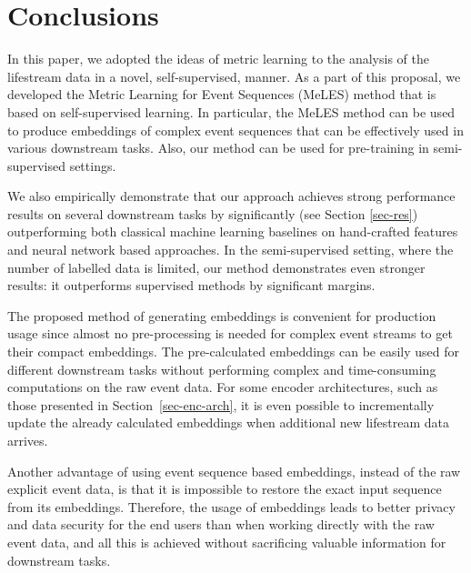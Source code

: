 \documentclass[sigconf, anonymous]{acmart}
\begin{document}
\section{Conclusions} \label{sec-conclusions}

In this paper, we adopted the ideas of metric learning to the analysis of the lifestream data in a novel, self-supervised, manner. As a part of this proposal, we developed the Metric Learning for Event Sequences (MeLES) method that is based on self-supervised learning. 
In particular, the MeLES method can be used to produce embeddings of complex event sequences that can be effectively used in various downstream tasks. Also, our method can be used for pre-training in semi-supervised settings.

We also empirically demonstrate that our approach achieves strong performance results on several downstream tasks by significantly (see Section \ref{sec-res}) outperforming both classical machine learning baselines on hand-crafted features and neural network based approaches.
In the semi-supervised setting, where the number of labelled data is limited, our method demonstrates even stronger results: it outperforms supervised methods by significant margins.

The proposed method of generating embeddings is convenient for production usage since almost no pre-processing is needed for complex event streams to get their compact embeddings. The pre-calculated embeddings can be easily used for different downstream tasks without performing complex and time-consuming computations on the raw event data. For some encoder architectures, such as those presented in Section~\ref{sec-enc-arch}, it is even possible to incrementally update the already calculated embeddings when additional new lifestream data arrives.


Another advantage of using event sequence based embeddings, instead of the raw explicit event data, is that it is impossible to restore the exact input sequence from its embeddings. Therefore, the usage of embeddings leads to better privacy and data security for the end users than when working directly with the raw event data, and all this is achieved without sacrificing valuable information for downstream tasks.





\end{document}
